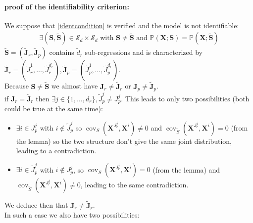 \documentclass[12pt,a4paper]{report}
\begin{document}
\paragraph{proof of the identifiability criterion:} We suppose that \ref{identcondition} is verified and the model is not identifiable:
\begin{eqnarray}
	\exists (\boldsymbol{S},\tilde{\boldsymbol{S}}) \in \mathcal{S}_d\times \mathcal{S}_d \textrm{ with } \boldsymbol{S} \neq \tilde{\boldsymbol{S}} \textrm{ and }
	\mathbb{P}(\boldsymbol{X};\boldsymbol{S})=\mathbb{P}(\boldsymbol{X};\tilde{\boldsymbol{S}})
 \end{eqnarray}
 $\tilde{\boldsymbol{S}}=(\tilde{\boldsymbol{J}}_r,\tilde{\boldsymbol{J}}_p)$ contains $\tilde{d}_r$ sub-regressions and is characterized by $\tilde{\boldsymbol{J}}_r=(\tilde{J}_r^1,\dots,\tilde{J}_r^{\tilde{d}_r}),\tilde{\boldsymbol{J}}_p=(\tilde{J}_p^1,\dots,\tilde{J}_p^{\tilde{d}_r})$.\\
Because $\boldsymbol{S}\neq \tilde{\boldsymbol{S}} $ we almost have $\boldsymbol{J}_r\neq \tilde{\boldsymbol{J}}_r$ or $\boldsymbol{J}_p\neq \tilde{\boldsymbol{J}}_p$.\\
if $\boldsymbol{J}_r = \tilde{\boldsymbol{J}}_r$ then $\exists j \in \{1,\dots,d_r\}, \tilde{J}_p^j\neq J_p^j$.
This leads to only two possibilities (both could be true at the same time):
\begin{itemize}
	\item $\exists i \in J_p^j$ with $i \notin \tilde{J}_p^j$ so $\operatorname{cov}_{S}(\boldsymbol{X}^{J_r^j},\boldsymbol{X}^{i})\neq 0$ and $\operatorname{cov}_{\tilde{S}}(\boldsymbol{X}^{J_r^j},\boldsymbol{X}^{i})= 0$ (from the lemma) so the two structure don't give the same joint distribution, leading to a contradiction.
	\item $\exists i \in \tilde{J}_p^j$ with $i \notin J_p^j$, so $\operatorname{cov}_{S}(\boldsymbol{X}^{J_r^j},\boldsymbol{X}^{i})= 0$ (from the lemma) and $\operatorname{cov}_{\tilde{S}}(\boldsymbol{X}^{J_r^j},\boldsymbol{X}^{i})\neq 0$, leading to the same contradiction.
\end{itemize} 
We deduce then that $\boldsymbol{J}_r\neq \tilde{\boldsymbol{J}}_r$.\\
 In such a case we also have two possibilities:
\end{document}
